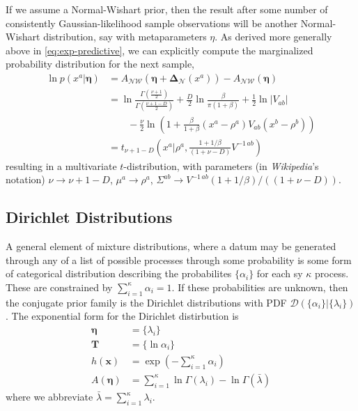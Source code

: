 \documentclass[aps,showpacs,twocolumn,prd,superscriptaddress,nofootinbib]{revtex4}
\newcommand{\nn}{\nonumber}
\begin{document}
If we assume a Normal-Wishart prior, then the result after some number of consistently Gaussian-likelihood sample observations will be another Normal-Wishart distribution, say with metaparameters $\eta$.  As derived more generally above in \eqref{eq:exp-predictive}, we can explicitly compute the marginalized probability distribution for the next sample,
\begin{align}
  \ln p(x^a|\bm\eta)&=A_{\mathcal{NW}}(\bm\eta+\bm\Delta_{\mathcal{N}}(x^a))-A_{\mathcal{NW}}(\bm\eta)\nn\\
  &=\ln\frac{\Gamma\left(\frac{\nu+1}2\right)}{\Gamma\left(\frac{\nu+1-D}{2}\right)}+\frac D2\ln\frac{\beta}{\pi(1+\beta)}+\frac12\ln\left|V_{ab}\right|
  \nn\\&\qquad
  -\frac\nu2\ln\left(1+\frac\beta{1+\beta}(x^a-\rho^a)V_{ab}(x^b-\rho^b)\right)\nn\\
  &=t_{\nu+1-D}\left(x^a\big|\rho^a,\frac{1+1/\beta}{(1+\nu-D)}V^{-1\,ab}\right)\label{eq:norm-predictive}
\end{align}
resulting in a multivariate $t$-distribution, with parameters (in \textit{Wikipedia}'s notation) $\nu\rightarrow\nu+1-D$, $\mu^a\rightarrow\rho^a$, $\Sigma^{ab}\rightarrow V^{-1\,ab}({1+1/\beta})/({(1+\nu-D)})$.


\subsection{Dirichlet Distributions}
A general element of mixture distributions, where a datum may be generated through any of a list of possible processes through some probability is some form of categorical distribution describing the probabilites $\{\alpha_i\}$ for each sy $\kappa$ process.  These are constrained by $\sum_{i=1}^\kappa\alpha_i=1$. If these probabilities are unknown, then the conjugate prior family is the Dirichlet distributions with PDF $\mathcal{D}\left(\{\alpha_i\}|\{\lambda_i\}\right)$.  The exponential form for the Dirichlet distirbution is
\begin{align*}
\bm\eta&=\{\lambda_i\}\\
\bm T&=\{\ln\alpha_i\}\\
h(\bm x)&=\exp\left(-\sum_{i=1}^\kappa\alpha_i\right)\\
A(\bm\eta)&=\sum_{i=1}^\kappa\ln\Gamma(\lambda_i)-\ln\Gamma(\bar\lambda)
\end{align*}
where we abbreviate $\bar\lambda=\sum_{i=1}^\kappa\lambda_i$.
\end{document}
